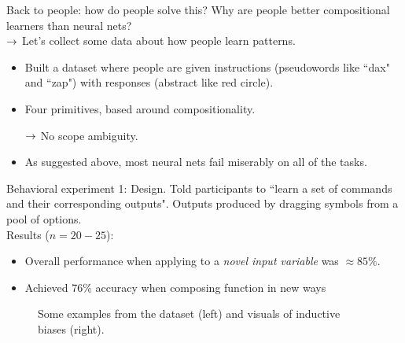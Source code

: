 Back to people: how do people solve this? Why are people better compositional learners than neural nets? \\

$\rightarrow$ Let's collect some data about how people learn patterns.
\begin{itemize}
    \item Built a dataset where people are given instructions (pseudowords like ``dax" and ``zap") with responses (abstract like red circle).
    \item Four primitives, based around compositionality.
    
    $\rightarrow$ No scope ambiguity.
    
    \item As suggested above, most neural nets fail miserably on all of the tasks.
\end{itemize}

Behavioral experiment 1: Design. Told participants to ``learn a set of commands and their corresponding outputs". Outputs produced by dragging symbols from a pool of options. \\

Results ($n=20-25$):
\begin{itemize}
    \item Overall performance when applying to a {\it novel input variable} was $\approx 85\%$.
    
    \item Achieved 76\% accuracy when composing function in new ways
\end{itemize}

\begin{figure}[h!]
    \centering
    \caption{Some examples from the dataset (left) and visuals of inductive biases (right).}
    \label{fig:blicket}
\end{figure}

